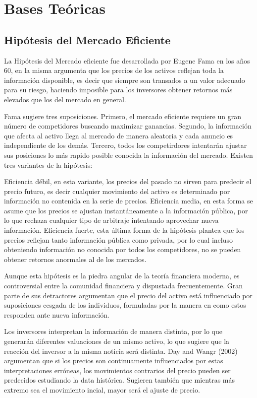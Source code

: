 \documentclass[a4paper,12pt]{Latex/Classes/PhDthesisPSnPDF}
\begin{document}
\section{Bases Teóricas}


\subsection{Hipótesis del Mercado Eficiente}

La Hipótesis del Mercado eficiente fue desarrollada por Eugene Fama en los años 60, en la misma argumenta que los precios de los activos reflejan toda la información disponible, es decir que siempre son transados a un valor adecuado para su riesgo, haciendo imposible para los inversores obtener retornos más elevados que los del mercado en general. 

Fama sugiere tres suposiciones. Primero, el mercado eficiente requiere un gran número de competidores buscando maximizar ganancias. Segundo, la información que afecta al activo llega al mercado de manera aleatoria y cada anuncio es independiente de los demás. Tercero, todos los competirdores intentarán ajustar sus posiciones lo más rapido posible conocida la información del mercado. Existen tres variantes de la hipótesis:

Eficiencia débil, en esta variante, los precios del pasado no sirven para predecir el precio futuro, es decir cualquier movimiento del activo es determinado por información no contenida en la serie de precios. Eficiencia media, en esta forma se asume que los precios se ajustan instantáneamente a la información pública, por lo que rechaza cualquier tipo de arbitraje intentando aprovechar nueva información. Eficiencia fuerte, esta última forma de la hipótesis plantea que los precios reflejan tanto información pública como privada, por lo cual incluso obteniendo información no conocida por todos los competidores, no se pueden obtener retornos anormales al de los mercados.

Aunque esta hipótesis es la piedra angular de la teoría financiera moderna, es controversial entre la comunidad financiera y dispustada frecuentemente. Gran parte de sus detractores argumentan que el precio del activo está influenciado por suposiciones cesgada de los individuos, formuladas por la manera en como estos responden ante nueva información.

Los inversores interpretan la información de manera distinta, por lo que generarán diferentes valuaciones de un mismo activo, lo que sugiere que la reacción del inversor a la misma noticia será distinta. Day and Wangr (2002) argumentan que si los precios son continuamente influenciados por estas interpretaciones erróneas, los movimientos contrarios del precio pueden ser predecidos estudiando la data histórica. Sugieren también que mientras más extremo sea el movimiento incial, mayor será el ajuste de precio.
\end{document}
